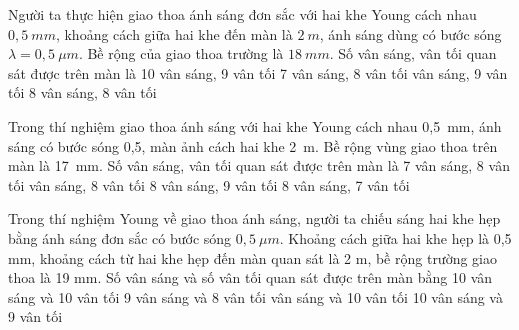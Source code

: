 \begin{ex}
Người ta thực hiện giao thoa ánh sáng đơn sắc với hai khe Young cách nhau $0,5\ mm$, khoảng cách giữa hai khe đến màn là $2\ m$, ánh sáng dùng có bước sóng $\lambda = 0,5\ \mu m$. Bề rộng của giao thoa trường là $18\ mm$. Số vân sáng, vân tối quan sát được trên màn là 
\choice
{10 vân sáng, 9 vân tối}
{7 vân sáng, 8 vân tối}
{ vân sáng, 9 vân tối}
{8 vân sáng, 8 vân tối}
\end{ex}
\begin{ex}%
Trong thí nghiệm giao thoa ánh sáng với hai khe Young cách nhau 0,5\ mm, ánh sáng có bước sóng 0,5\microm, màn ảnh cách hai khe 2\ m. Bề rộng vùng giao thoa trên màn là 17\ mm. Số vân sáng, vân tối quan sát được trên màn là
\choice
{7 vân sáng, 8 vân tối}
{ vân sáng, 8 vân tối}
{8 vân sáng, 9 vân tối}
{8 vân sáng, 7 vân tối}

\end{ex} 
\begin{ex}%
Trong thí nghiệm Young về giao thoa ánh sáng, người ta chiếu sáng hai khe hẹp bằng ánh sáng đơn sắc có bước sóng $0,5 \ \mu m$. Khoảng cách giữa hai khe hẹp là 0,5 mm, khoảng cách từ hai khe hẹp đến màn quan sát là 2 m, bề rộng trường giao thoa là 19 mm. Số vân sáng và số vân tối quan sát được trên màn bằng
\choice
{10 vân sáng và 10 vân tối}
{9 vân sáng và 8 vân tối}
{ vân sáng và 10 vân tối}
{10 vân sáng và 9 vân tối}

\end{ex} 
